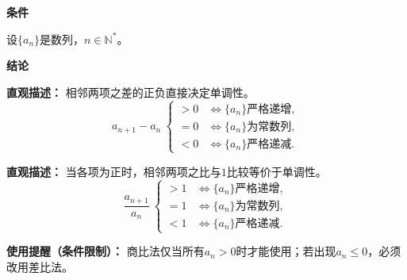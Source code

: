 \begin{statementbox}
	\textbf{\textcolor{CStatement}{条件}}
	\begin{description}[style=nextline, leftmargin=2.8em, labelsep=0.5em, itemsep=0.35em]
		\item[\textbf{\textcolor{CStatement}{条件1（数列与指标）：}}]
			设$\{a_n\}$是数列，$n\in\mathbb{N}^*$。
	\end{description}
	\textbf{\textcolor{CStatement}{结论}}
	\begin{description}[style=nextline, leftmargin=2.8em, labelsep=0.5em, itemsep=0.45em]
		\item[\textbf{\textcolor{CStatement}{结论一（差比法判定）：}}]
			\textbf{\textcolor{CStatement}{直观描述：}}
			相邻两项之差的正负直接决定单调性。
			\[
				a_{n+1}-a_n\
				\begin{cases}
					>0&\iff\{a_n\}\text{严格递增},\\=0&\iff\{a_n\}\text{为常数列},\\<0&\iff\{a_n\}\text{严格递减}.
			\end{cases}
			\]
		\item[\textbf{\textcolor{CStatement}{推广结论（商比法判定）：}}]
			\textbf{\textcolor{CStatement}{直观描述：}}
			当各项为正时，相邻两项之比与$1$比较等价于单调性。
			\[
				\frac{a_{n+1}}{a_n}\
				\begin{cases}
					>1&\iff\{a_n\}\text{严格递增},\\=1&\iff\{a_n\}\text{为常数列},\\<1&\iff\{a_n\}\text{严格递减}.
			\end{cases}
			\]
	\end{description}

	\medskip
	\textbf{\textcolor{CStatement}{使用提醒（条件限制）：}}
	商比法仅当所有$a_n>0$时才能使用；若出现$a_n\leq 0$，必须改用差比法。
\end{statementbox}
